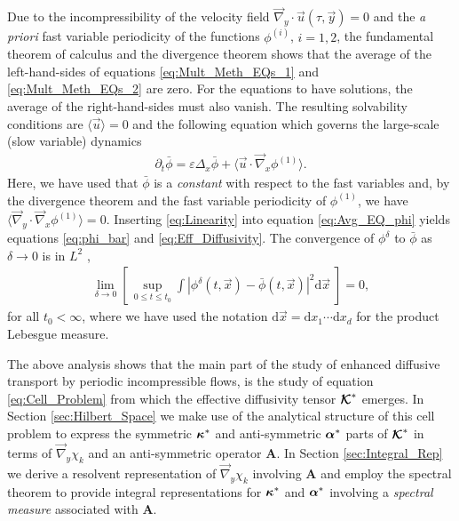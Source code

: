 \documentclass[11pt]{amsart}
\renewcommand{\d}{\mathrm{d}}
\newcommand{\Ab}{\mathbf{A}}
\newcommand\Kbc{\mbox{\boldmath${\mathcal{K}}$}}
\newcommand\balpha{\mbox{\boldmath${\alpha}$}}
\newcommand\bkappa{\mbox{\boldmath${\kappa}$}}
\begin{document}
Due to the incompressibility of the velocity field
$\vec{\nabla}_y\cdot\vec{u}(\tau,\vec{y})=0$ and the \emph{a priori} fast variable
periodicity of the functions $\phi^{(i)}$, $i=1,2$,  the
fundamental theorem of calculus and the divergence theorem shows that
the average of the left-hand-sides of equations
\eqref{eq:Mult_Meth_EQs_1} and \eqref{eq:Mult_Meth_EQs_2} are
zero. For the equations to have solutions, the average of the
right-hand-sides must also vanish.
The resulting solvability conditions are $\langle\vec{u}\rangle=0$
and the following equation which governs the large-scale (slow
variable) dynamics   
%
\begin{align}\label{eq:Avg_EQ_phi}
  \partial_t\bar{\phi}=\varepsilon\Delta_x\bar{\phi}+\langle\vec{u}\cdot\vec{\nabla}_x\phi^{(1)}\rangle.
\end{align}
%
Here, we have used that $\bar{\phi}$ is a \emph{constant} with respect to
the fast variables and, by the divergence theorem and the fast
variable periodicity of $\phi^{(1)}$, we have $\langle\vec{\nabla}_y\cdot
\vec{\nabla}_x\phi^{(1)}\rangle=0$. Inserting \eqref{eq:Linearity} into equation
\eqref{eq:Avg_EQ_phi} yields equations \eqref{eq:phi_bar} and
\eqref{eq:Eff_Diffusivity}. The convergence of $\phi^\delta$ to $\bar{\phi}$ as
$\delta\to0$ is in $L^2$ \cite{Fannjiang:SIAM_JAM:333},  
%
\begin{align}
  \lim_{\delta\to0}\left[\,\sup_{0\leq t\leq t_0}
    \int\left|\phi^\delta(t,\vec{x})-\bar{\phi}(t,\vec{x})\right|^2\d\vec{x}
    \;\right]=0,
\end{align}
%
for all $t_0<\infty$, where we have used the notation $\d\vec{x}=\d x_1\cdots \d
x_d$ for the product Lebesgue measure.



The above analysis shows that the main part of the study of enhanced
diffusive transport by periodic incompressible flows, is the study of
equation \eqref{eq:Cell_Problem} from which the effective diffusivity
tensor $\Kbc^*$ emerges. In Section \ref{sec:Hilbert_Space} we make
use of the analytical structure of this cell problem to express the
symmetric $\bkappa^*$ and anti-symmetric $\balpha^*$ parts of $\Kbc^*$
in terms of $\vec{\nabla}_y\chi_k$ and an anti-symmetric operator $\Ab$. In
Section \ref{sec:Integral_Rep} we derive a resolvent representation of
$\vec{\nabla}_y\chi_k$ involving $\Ab$ and employ the spectral theorem to
provide integral representations for $\bkappa^*$ and $\balpha^*$
involving a \emph{spectral measure} associated with $\Ab$.  
   
\end{document}
